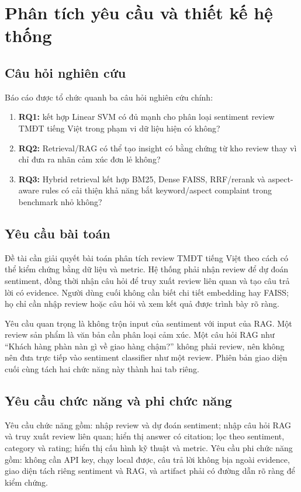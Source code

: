 \chapter{Phân tích yêu cầu và thiết kế hệ thống}
\section{Câu hỏi nghiên cứu}
Báo cáo được tổ chức quanh ba câu hỏi nghiên cứu chính:
\begin{enumerate}
    \item \textbf{RQ1:} \TFIDF{} kết hợp Linear SVM có đủ mạnh cho phân loại sentiment review TMĐT tiếng Việt trong phạm vi dữ liệu hiện có không?
    \item \textbf{RQ2:} Retrieval/RAG có thể tạo insight có bằng chứng từ kho review thay vì chỉ đưa ra nhãn cảm xúc đơn lẻ không?
    \item \textbf{RQ3:} Hybrid retrieval kết hợp BM25, Dense FAISS, RRF/rerank và aspect-aware rules có cải thiện khả năng bắt keyword/aspect complaint trong benchmark nhỏ không?
\end{enumerate}
\section{Yêu cầu bài toán}
Đề tài cần giải quyết bài toán phân tích review TMĐT tiếng Việt theo cách có thể kiểm chứng bằng dữ liệu và metric. Hệ thống phải nhận review để dự đoán sentiment, đồng thời nhận câu hỏi để truy xuất review liên quan và tạo câu trả lời có evidence. Người dùng cuối không cần biết chi tiết embedding hay FAISS; họ chỉ cần nhập review hoặc câu hỏi và xem kết quả được trình bày rõ ràng.

Yêu cầu quan trọng là không trộn input của sentiment với input của RAG. Một review sản phẩm là văn bản cần phân loại cảm xúc. Một câu hỏi RAG như “Khách hàng phàn nàn gì về giao hàng chậm?” không phải review, nên không nên đưa trực tiếp vào sentiment classifier như một review. Phiên bản giao diện cuối cùng tách hai chức năng này thành hai tab riêng.

\section{Yêu cầu chức năng và phi chức năng}
Yêu cầu chức năng gồm: nhập review và dự đoán sentiment; nhập câu hỏi RAG và truy xuất review liên quan; hiển thị answer có citation; lọc theo sentiment, category và rating; hiển thị cấu hình kỹ thuật và metric. Yêu cầu phi chức năng gồm: không cần API key, chạy local được, câu trả lời không bịa ngoài evidence, giao diện tách riêng sentiment và RAG, và artifact phải có đường dẫn rõ ràng để kiểm chứng.

